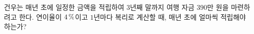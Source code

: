 건우는 매년 초에 일정한 금액을 적립하여 $3$년째 말까지 여행 자금 $390$만 원을 마련하려고 한다. 연이율이 $4\mkern3mu \%$이고 $1$년마다 복리로 계산할 때, 매년 초에 얼마씩 적립해야 하는가? 
